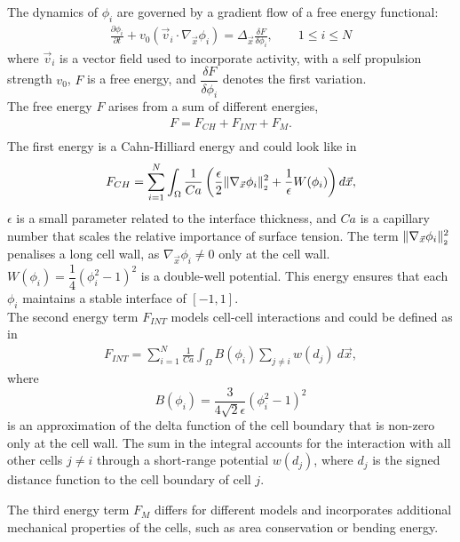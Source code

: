 The dynamics of $\phi_i$ are governed by a gradient flow of a free energy functional:
\begin{align*}
	\frac{\partial \phi_i}{\partial t} + v_0 (\vec{v}_i \cdot \nabla_{\vec{x}} \phi_i) = \Delta_{\vec{x}} \frac{\delta F}{\delta \phi_i}, \qquad 1 \leq i \leq N 
\end{align*}
where $\vec{v}_i$ is a vector field used to incorporate activity, with a self propulsion strength $v_0$, $F$ is a free energy, and $\dfrac{\delta F}{\delta \phi_i}$ denotes the first variation.\\
The free energy $F$ arises from a sum of different energies, 
\begin{align*}
	F = F_{CH} + F_{INT} + F_{M}. \\
\end{align*}
The first energy is a Cahn-Hilliard energy and could look like in~\cite{wenzel2021}
\begin{align*} 
	F_{CH} = \sum\limits_{i=1}^N \int_{\Omega} \dfrac{1}{Ca} \left( \dfrac{\epsilon}{2} \norm[\nabla_{\vec{x}} \phi_i]^2 + \dfrac{1}{\epsilon} W(\phi_i) \right) d\vec{x},
\end{align*}
$\epsilon$ is a small parameter related to the interface thickness, and $Ca$ is a capillary number that scales the relative importance of surface tension.
The term $\norm[\nabla_{\vec{x}} \phi_i]^2$ penalises a long cell wall, as $\nabla_{\vec{x}} \phi_i \neq 0$ only at the cell wall.
$W(\phi_i) = \dfrac{1}{4} (\phi_i^2 - 1)^2$ is a double-well potential. 
This energy ensures that each $\phi_i$ maintains a stable interface of $[-1,1]$.  \\ 
The second energy term $F_{INT}$ models cell-cell interactions and could be defined as in~\cite{wenzel2021}
\begin{align*}
	F_{INT} = \sum\limits_{i=1}^N \frac{1}{Ca} \int_{\Omega} B(\phi_i) \sum\limits_{j \neq i} w(d_j) \: d\vec{x},
\end{align*}
where 
\[B(\phi_i) = \dfrac{3}{4\sqrt{2}\epsilon} (\phi_i^2 - 1)^2\]
is an approximation of the delta function of the cell boundary that is non-zero only at the cell wall.
The sum in the integral accounts for the interaction with all other cells $j \neq i$ through a short-range potential $w(d_j)$, where $d_j$ is the signed distance function to the cell boundary of cell $j$.  

The third energy term $F_M$ differs for different models and incorporates additional mechanical properties of the cells, such as area conservation or bending energy.


